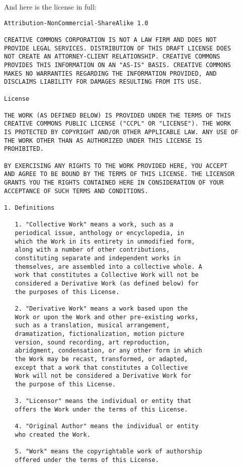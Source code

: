 \noindent
And here is the license in full:
\begin{Verbatim}[fontsize=\scriptsize]
Attribution-NonCommercial-ShareAlike 1.0

CREATIVE COMMONS CORPORATION IS NOT A LAW FIRM AND DOES NOT
PROVIDE LEGAL SERVICES. DISTRIBUTION OF THIS DRAFT LICENSE DOES
NOT CREATE AN ATTORNEY-CLIENT RELATIONSHIP. CREATIVE COMMONS
PROVIDES THIS INFORMATION ON AN "AS-IS" BASIS. CREATIVE COMMONS
MAKES NO WARRANTIES REGARDING THE INFORMATION PROVIDED, AND
DISCLAIMS LIABILITY FOR DAMAGES RESULTING FROM ITS USE.

License

THE WORK (AS DEFINED BELOW) IS PROVIDED UNDER THE TERMS OF THIS
CREATIVE COMMONS PUBLIC LICENSE ("CCPL" OR "LICENSE"). THE WORK
IS PROTECTED BY COPYRIGHT AND/OR OTHER APPLICABLE LAW. ANY USE OF
THE WORK OTHER THAN AS AUTHORIZED UNDER THIS LICENSE IS
PROHIBITED.

BY EXERCISING ANY RIGHTS TO THE WORK PROVIDED HERE, YOU ACCEPT
AND AGREE TO BE BOUND BY THE TERMS OF THIS LICENSE. THE LICENSOR
GRANTS YOU THE RIGHTS CONTAINED HERE IN CONSIDERATION OF YOUR
ACCEPTANCE OF SUCH TERMS AND CONDITIONS.

1. Definitions

   1. "Collective Work" means a work, such as a
   periodical issue, anthology or encyclopedia, in
   which the Work in its entirety in unmodified form,
   along with a number of other contributions,
   constituting separate and independent works in
   themselves, are assembled into a collective whole. A
   work that constitutes a Collective Work will not be
   considered a Derivative Work (as defined below) for
   the purposes of this License.

   2. "Derivative Work" means a work based upon the
   Work or upon the Work and other pre-existing works,
   such as a translation, musical arrangement,
   dramatization, fictionalization, motion picture
   version, sound recording, art reproduction,
   abridgment, condensation, or any other form in which
   the Work may be recast, transformed, or adapted,
   except that a work that constitutes a Collective
   Work will not be considered a Derivative Work for
   the purpose of this License.

   3. "Licensor" means the individual or entity that
   offers the Work under the terms of this License.

   4. "Original Author" means the individual or entity
   who created the Work.

   5. "Work" means the copyrightable work of authorship
   offered under the terms of this License.


\end{Verbatim}
